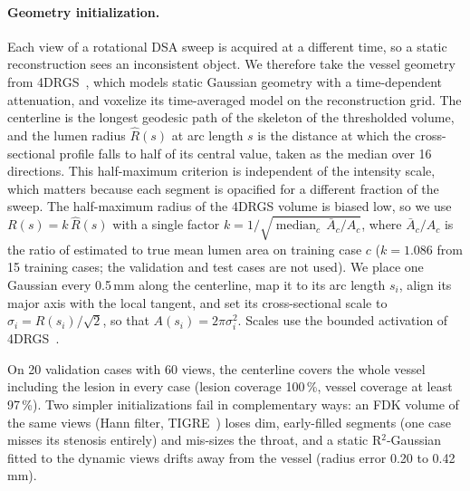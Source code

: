 
\paragraph{Geometry initialization.}
Each view of a rotational DSA sweep is acquired at a different time, so a
static reconstruction sees an inconsistent object. We therefore take the
vessel geometry from 4DRGS~\cite{liu2025fourdrgs}, which models static
Gaussian geometry with a time-dependent attenuation, and voxelize its
time-averaged model on the reconstruction grid. The centerline is the
longest geodesic path of the skeleton of the thresholded volume, and the
lumen radius $\hat R(s)$ at arc length $s$ is the distance at which the
cross-sectional profile falls to half of its central value, taken as the
median over 16 directions. This half-maximum criterion is independent of
the intensity scale, which matters because each segment is opacified for
a different fraction of the sweep. The half-maximum radius of the 4DRGS
volume is biased low, so we use $R(s) = k\,\hat R(s)$ with a single factor
$k = 1/\sqrt{\operatorname{median}_c\, \bar A_c/A_c}$, where
$\bar A_c/A_c$ is the ratio of estimated to true mean lumen area on
training case $c$ ($k = 1.086$ from 15 training cases; the validation and
test cases are not used). We place one Gaussian every 0.5\,mm along the
centerline, map it to its arc length $s_i$, align its major axis with the
local tangent, and set its cross-sectional scale to
$\sigma_i = R(s_i)/\sqrt{2}$, so that $A(s_i) = 2\pi\sigma_i^2$. Scales use
the bounded activation of 4DRGS~\cite{liu2025fourdrgs}.

On 20 validation cases with 60 views, the centerline covers the whole
vessel including the lesion in every case (lesion coverage 100\,\%,
vessel coverage at least 97\,\%). Two simpler initializations fail in
complementary ways: an FDK volume of the same views (Hann filter,
TIGRE~\cite{biguri2016tigre}) loses dim, early-filled segments (one case
misses its stenosis entirely) and mis-sizes the throat, and a static
R$^2$-Gaussian~\cite{zha2024r2gaussian} fitted to the dynamic views drifts
away from the vessel (radius error 0.20 to 0.42\,mm).
